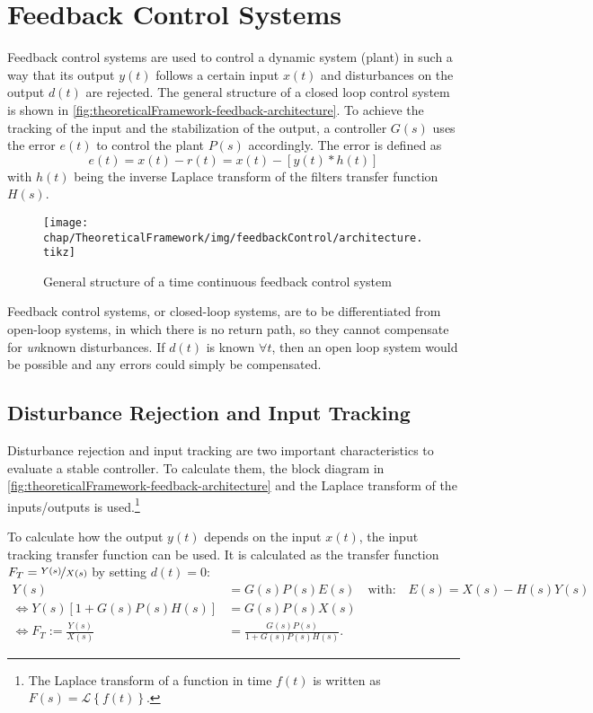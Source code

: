 \section{Feedback Control Systems}
Feedback control systems are used to control a dynamic system (plant) in such a way that its output $y(t)$ follows a certain input $x(t)$ and disturbances on the output $d(t)$ are rejected. The general structure of a closed loop control system is shown in \autoref{fig:theoreticalFramework-feedback-architecture}. To achieve the tracking of the input and the stabilization of the output, a controller $G(s)$ uses the error $e(t)$ to control the plant $P(s)$ accordingly.
The error is defined as
\begin{equation}
e(t)=x(t)-r(t) = x(t)-[y(t)\ast h(t)]
\end{equation}
with $h(t)$ being the inverse Laplace transform of the filters transfer function $H(s)$.

\begin{figure}[tb]
	\centering
	\texttt{[image: chap/TheoreticalFramework/img/feedbackControl/architecture.tikz]}
	\caption{General structure of a time continuous feedback control system}
	\label{fig:theoreticalFramework-feedback-architecture}
\end{figure}

Feedback control systems, or closed-loop systems, are to be differentiated from open-loop systems, in which there is no return path, so they cannot compensate for \textit{un}known disturbances. If $d(t)$ is known $\forall t$, then an open loop system would be possible and any errors could simply be compensated.

\subsection{Disturbance Rejection and Input Tracking}\label{sec:drandtrack}
Disturbance rejection and input tracking are two important characteristics to evaluate a stable controller. To calculate them, the block diagram in \autoref{fig:theoreticalFramework-feedback-architecture} and the Laplace transform of the inputs/outputs is used.\footnote{The Laplace transform of a function in time $f(t)$ is written as $F(s)=\mathcal{L}\left\{f(t)\right\}$.} 

To calculate how the output $y(t)$ depends on the input $x(t)$, the input tracking transfer function can be used.\cite[p.~88]{Foellinger2016} It is calculated as the transfer function $F_T=\nicefrac{Y(s)}{X(s)}$ by setting $d(t)=0$:
\begin{align}\label{eq:inputTracking}
Y(s)&=G(s)P(s)E(s)\quad\text{with:}\quad E(s)=X(s)-H(s)Y(s)\\
\Leftrightarrow Y(s)\left[1+G(s)P(s)H(s)\right]&=G(s)P(s)X(s)\\
\Leftrightarrow F_T:=\frac{Y(s)}{X(s)} &= \frac{G(s)P(s)}{1+G(s)P(s)H(s)}.
\end{align}

